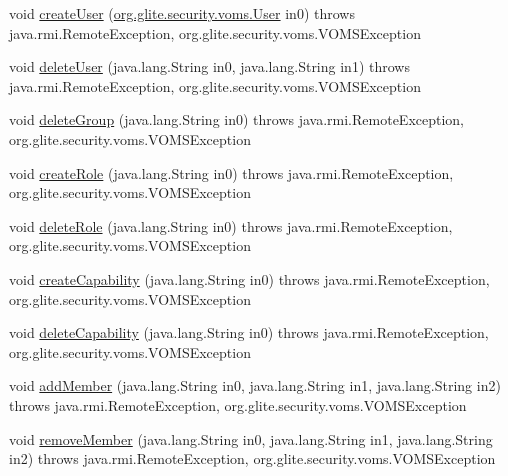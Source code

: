 \begin{DoxyCompactItemize}
\item 
void \hyperlink{classorg_1_1glite_1_1security_1_1voms_1_1service_1_1admin_1_1VOMSAdminSoapBindingSkeleton_af31579da21908a9b3a47afb7650e6e61}{createUser} (\hyperlink{classorg_1_1glite_1_1security_1_1voms_1_1User}{org.glite.security.voms.User} in0)  throws java.rmi.RemoteException, org.glite.security.voms.VOMSException     
\item 
void \hyperlink{classorg_1_1glite_1_1security_1_1voms_1_1service_1_1admin_1_1VOMSAdminSoapBindingSkeleton_aebe3314473321e0c9d6b8466f98d8699}{deleteUser} (java.lang.String in0, java.lang.String in1)  throws java.rmi.RemoteException, org.glite.security.voms.VOMSException     
\item 
void \hyperlink{classorg_1_1glite_1_1security_1_1voms_1_1service_1_1admin_1_1VOMSAdminSoapBindingSkeleton_a0c40b6106e019213be846c17ddad116d}{deleteGroup} (java.lang.String in0)  throws java.rmi.RemoteException, org.glite.security.voms.VOMSException     
\item 
void \hyperlink{classorg_1_1glite_1_1security_1_1voms_1_1service_1_1admin_1_1VOMSAdminSoapBindingSkeleton_a9a5f89bd754259858304f46800602b91}{createRole} (java.lang.String in0)  throws java.rmi.RemoteException, org.glite.security.voms.VOMSException     
\item 
void \hyperlink{classorg_1_1glite_1_1security_1_1voms_1_1service_1_1admin_1_1VOMSAdminSoapBindingSkeleton_a62b353be6f57ff06c204f319bfdbbc88}{deleteRole} (java.lang.String in0)  throws java.rmi.RemoteException, org.glite.security.voms.VOMSException     
\item 
void \hyperlink{classorg_1_1glite_1_1security_1_1voms_1_1service_1_1admin_1_1VOMSAdminSoapBindingSkeleton_a64a57e91d7e2afa3b853b7058d0cdf3b}{createCapability} (java.lang.String in0)  throws java.rmi.RemoteException, org.glite.security.voms.VOMSException     
\item 
void \hyperlink{classorg_1_1glite_1_1security_1_1voms_1_1service_1_1admin_1_1VOMSAdminSoapBindingSkeleton_af77b9f852bd8d87b11ab79a0ec73cbb6}{deleteCapability} (java.lang.String in0)  throws java.rmi.RemoteException, org.glite.security.voms.VOMSException     
\item 
void \hyperlink{classorg_1_1glite_1_1security_1_1voms_1_1service_1_1admin_1_1VOMSAdminSoapBindingSkeleton_ac2264dccd64158b8d7d57f86ff5f11e2}{addMember} (java.lang.String in0, java.lang.String in1, java.lang.String in2)  throws java.rmi.RemoteException, org.glite.security.voms.VOMSException     
\item 
void \hyperlink{classorg_1_1glite_1_1security_1_1voms_1_1service_1_1admin_1_1VOMSAdminSoapBindingSkeleton_acde0f9f9e2525da3d0a871f088aab20d}{removeMember} (java.lang.String in0, java.lang.String in1, java.lang.String in2)  throws java.rmi.RemoteException, org.glite.security.voms.VOMSException     

\end{DoxyCompactItemize}
